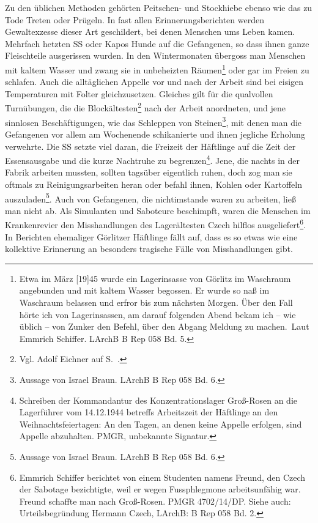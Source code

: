 Zu den üblichen Methoden gehörten Peitschen- und Stockhiebe ebenso wie das zu Tode Treten oder Prügeln. In fast allen Erinnerungsberichten werden Gewaltexzesse dieser Art geschildert, bei denen Menschen ums Leben kamen. Mehrfach hetzten SS oder Kapos Hunde auf die Gefangenen, so dass ihnen ganze Fleischteile ausgerissen wurden. In den Wintermonaten übergoss man Menschen mit kaltem Wasser und zwang sie in unbeheizten Räumen\footnote{\glqq Etwa im März [19]45 wurde ein Lagerinsasse von Görlitz im Waschraum angebunden und mit kaltem Wasser begossen. Er wurde so naß im Waschraum belassen und erfror bis zum nächsten Morgen. Über den Fall hörte ich von Lagerinsassen, am darauf folgenden Abend bekam ich -- wie üblich -- von Zunker den Befehl, über den Abgang Meldung zu machen.\grqq~Laut Emmrich Schiffer. LArchB B Rep 058 Bd. 5.} oder gar im Freien zu schlafen. Auch die alltäglichen Appelle vor und nach der Arbeit sind bei eisigen Temperaturen mit Folter gleichzusetzen. Gleiches gilt für die qualvollen \glqq Turnübungen\grqq, die die Blockältesten\footnote{Vgl. Adolf Eichner auf S.~\pageref{turnen}.} nach der Arbeit anordneten, und jene sinnlosen Beschäftigungen, wie das Schleppen von Steinen\footnote{Aussage von Israel Braun. LArchB B Rep 058 Bd. 6.}, mit denen man die Gefangenen vor allem am Wochenende schikanierte und ihnen jegliche Erholung verwehrte. Die SS setzte viel daran, die Freizeit der Häftlinge auf die Zeit der Essensausgabe und die kurze Nachtruhe zu begrenzen\footnote{Schreiben der Kommandantur des Konzentrationslager Groß-Rosen an die Lagerführer vom 14.12.1944 betreffs Arbeitszeit der Häftlinge an den Weihnachtsfeiertagen: An den Tagen, an denen keine Appelle erfolgen, sind Appelle abzuhalten. PMGR, unbekannte Signatur.}. Jene, die nachts in der Fabrik arbeiten mussten, sollten tagsüber eigentlich ruhen, doch zog man sie oftmals zu Reinigungsarbeiten heran oder befahl ihnen, Kohlen oder Kartoffeln auszuladen\footnote{Aussage von Israel Braun. LArchB B Rep 058 Bd. 6.}. Auch von Gefangenen, die nicht\pagebreak\newpage imstande waren zu arbeiten, ließ man nicht ab. Als Simulanten und Saboteure beschimpft, waren die Menschen im Krankenrevier den Misshandlungen des Lagerältesten Czech hilflos ausgeliefert\footnote{Emmrich Schiffer berichtet von einem Studenten namens Freund, den Czech der Sabotage bezichtigte, weil er wegen Fussphlegmone arbeitsunfähig war. Freund schaffte man nach Groß-Rosen. PMGR 4702/14/DP. Siehe auch: Urteilsbegründung Hermann Czech, LArchB: B Rep 058 Bd. 2.}.
\newline
In Berichten ehemaliger Görlitzer Häftlinge fällt auf, dass es so etwas wie eine kollektive Erinnerung an besonders tragische Fälle von Misshandlungen gibt.

